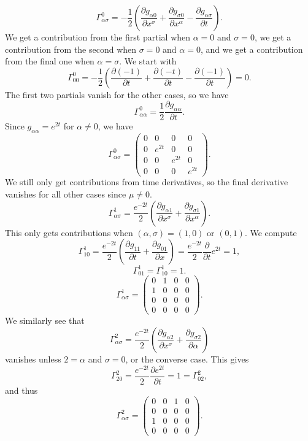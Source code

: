 \documentclass[11pt, letterpaper]{article}
\theoremstyle{plain}
\begin{document}
\[
	\Gamma ^0_{\alpha \sigma } =-\frac{1}{2} \left( \frac{\partial g_{\alpha 0} }{\partial x^\sigma } +\frac{\partial g_{\sigma 0} }{\partial x^\alpha } -\frac{\partial g_{\alpha \sigma } }{\partial t}  \right) 
.\]
We get a contribution from the first partial when $\alpha=0$ and $\sigma =0$, we get a contribution from the second when $\sigma =0$ and $\alpha =0$, and we get a contribution from the final one when $\alpha =\sigma $. We start with
\[
	\Gamma^0_{00} =-\frac{1}{2} \left( \frac{\partial (-1)}{\partial t} +\frac{\partial (-t)}{\partial t}-\frac{\partial (-1)}{\partial t}  \right) =0
.\]
The first two partials vanish for the other cases, so we have
\[
	\Gamma ^0_{\alpha \alpha } =\frac{1}{2} \frac{\partial g_{\alpha \alpha } }{\partial t}
.\]
Since $g_{\alpha \alpha } =e^{2t} $ for $\alpha \neq 0$, we have
\[
	\Gamma^0_{\alpha \sigma } =\begin{pmatrix}
	 0& 0 & 0 & 0 \\
	0 & e^{2t}  & 0 & 0 \\
	0 & 0 & e^{2t}  & 0 \\
	0 & 0 & 0 & e^{2t} 
	\end{pmatrix}
.\]
We still only get contributions from time derivatives, so the final derivative vanishes for all other cases since $\mu \neq 0$.
\[
	\Gamma ^1_{\alpha \sigma } =\frac{e^{-2t} }{2} \left( \frac{\partial g_{\alpha 1} }{\partial x^\sigma } +\frac{\partial g_{\sigma 1} }{\partial x^\alpha }  \right) 
.\]
This only gets contributions when $(\alpha ,\sigma )=(1,0)$ or $(0,1)$. We compute
\[
	\Gamma ^1_{10} =\frac{e^{-2t} }{2} \left( \frac{\partial g_{11} }{\partial t} +\frac{\partial g_{01} }{\partial x}  \right) =\frac{e^{-2t} }{2} \frac{\partial }{\partial t} e^{2t} =1
,\]
\[
	\Gamma ^1_{01} =\Gamma ^1_{10} =1
.\]
\[
	\Gamma ^1_{\alpha \sigma } =\begin{pmatrix}
	0 & 1  & 0 & 0 \\
	1  & 0 & 0 & 0 \\
	0 & 0 & 0 & 0 \\
	0 & 0 & 0 & 0
	\end{pmatrix}
.\]
We similarly see that
\[
	\Gamma ^2_{\alpha \sigma } =\frac{e^{-2t} }{2} \left( \frac{\partial g_{\alpha 2} }{\partial x^\sigma } +\frac{\partial g_{\sigma 2} }{\partial \alpha }  \right) 
\]
vanishes unless $2=\alpha $ and $\sigma =0$, or the converse case. This gives
\[
	\Gamma ^2_{20} =\frac{e^{-2t} }{2} \frac{\partial e^{2t} }{\partial t} =1=\Gamma ^2_{02} 
,\]
and thus
\[
	\Gamma ^2_{\alpha \sigma } =\begin{pmatrix}
	0 & 0 & 1 & 0 \\
	0 & 0 & 0 & 0 \\
	1 & 0 & 0 & 0 \\
	0 & 0 & 0 & 0
	\end{pmatrix}
.\]
\end{document}
